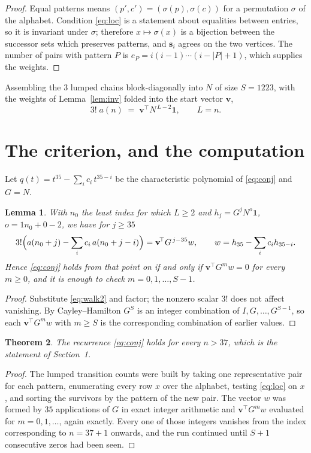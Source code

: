 \documentclass[11pt,a4paper]{article}
\theoremstyle{plain}
\newtheorem{theorem}{Theorem}
\newtheorem{lemma}[theorem]{Lemma}
\theoremstyle{definition}
\begin{document}
\begin{proof}
Equal patterns means $(p',c')=(\sigma(p),\sigma(c))$ for a permutation $\sigma$ of the
alphabet. Condition \eqref{eq:loc} is a statement about equalities between entries, so it is
invariant under $\sigma$; therefore $x\mapsto\sigma(x)$ is a bijection between the successor
sets which preserves patterns, and $\mathbf{s}_i$ agrees on the two vertices. The number of
pairs with pattern $P$ is $e_P=i(i-1)\cdots(i-|P|+1)$, which supplies the weights.
\end{proof}

Assembling the $3$ lumped chains block-diagonally into $N$ of size $S=1223$, with the
weights of Lemma~\ref{lem:inv} folded into the start vector $\mathbf{v}$,
\begin{equation}\label{eq:walk2}
3!\;a(n)\;=\;\mathbf{v}^{\!\top}N^{\,L-2}\mathbf{1},\qquad L=n .
\end{equation}

\section{The criterion, and the computation}

Let $q(t)=t^{35}-\sum_i c_i\,t^{35-i}$ be the characteristic polynomial of
\eqref{eq:conj} and $G=N$.

\begin{lemma}\label{lem:crit}
With $n_0$ the least index for which $L\ge2$ and $h_j=G^{j}N^{o}\mathbf{1}$,
$o=1n_0+0-2$, we have for $j\ge35$
\[
3!\Bigl(a(n_0+j)-\sum_i c_i\,a(n_0+j-i)\Bigr)
=\mathbf{v}^{\!\top}G^{\,j-35}w,\qquad
w=h_{35}-\sum_i c_i h_{35-i} .
\]
Hence \eqref{eq:conj} holds from that point on if and only if
$\mathbf{v}^{\!\top}G^{m}w=0$ for every $m\ge0$, and it is enough to check
$m=0,1,\dots,S-1$.
\end{lemma}

\begin{proof}
Substitute \eqref{eq:walk2} and factor; the nonzero scalar $3!$ does not affect
vanishing. By Cayley--Hamilton $G^{S}$ is an integer combination of $I,G,\dots,G^{S-1}$,
so each $\mathbf{v}^{\!\top}G^{m}w$ with $m\ge S$ is the corresponding combination of
earlier values.
\end{proof}

\begin{theorem}
The recurrence \eqref{eq:conj} holds for every $n>37$, which is the statement of
Section~1.
\end{theorem}

\begin{proof}
The lumped transition counts were built by taking one representative pair for each pattern,
enumerating every row $x$ over the alphabet, testing \eqref{eq:loc} on $x$, and sorting
the survivors by the pattern of the new pair. The vector $w$ was formed by $35$
applications of $G$ in exact integer arithmetic and $\mathbf{v}^{\!\top}G^{m}w$
evaluated for $m=0,1,\dots$, again exactly. Every one of those integers vanishes from the
index corresponding to $n=37+1$ onwards, and the run continued until $S+1$ consecutive
zeros had been seen.
\end{proof}
\end{document}
